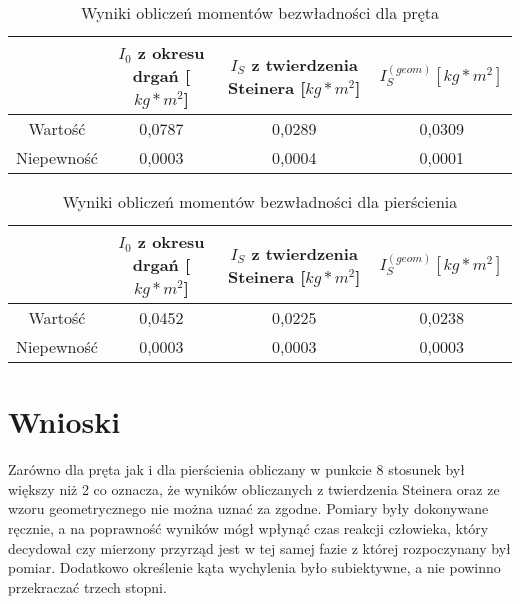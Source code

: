 \documentclass[a4paper,10pt,twoside]{article}
\begin{document}
\begin{table}[h]
	\caption{Wyniki obliczeń momentów bezwładności dla pręta}
 	\begin{tabular}[hb]{|c|c|c|c|}
 		\hline
 		& $I_0$ z okresu drgań [$kg*m^2$] & $I_S$ z twierdzenia Steinera [$kg*m^2$]& $I_S^{(geom)} [kg*m^2]$ \\ \hline
 		Wartość&0,0787&0,0289&0,0309 \\ \hline
 		Niepewność&0,0003&0,0004&0,0001 \\ \hline
 	\end{tabular}
\end{table}

\begin{table}[h]
	\caption{Wyniki obliczeń momentów bezwładności dla pierścienia}
	\begin{tabular}[hb]{|c|c|c|c|}
		\hline
		& $I_0$ z okresu drgań [$kg*m^2$] & $I_S$ z twierdzenia Steinera [$kg*m^2$]& $I_S^{(geom)} [kg*m^2]$ \\ \hline
		Wartość&0,0452&0,0225&0,0238 \\ \hline
		Niepewność&0,0003&0,0003&0,0003 \\ \hline
	\end{tabular}
\end{table}
	\section{Wnioski}
	Zarówno dla pręta jak i dla pierścienia obliczany w punkcie 8 stosunek był większy niż 2 co oznacza, że wyników obliczanych z twierdzenia Steinera oraz ze wzoru geometrycznego nie można uznać za zgodne. 
	Pomiary były dokonywane ręcznie, a na poprawność wyników mógł wpłynąć czas reakcji człowieka, który decydował czy mierzony przyrząd jest w tej samej fazie z której rozpoczynany był pomiar. Dodatkowo określenie kąta wychylenia było subiektywne, a nie powinno przekraczać trzech stopni.
\end{document}
